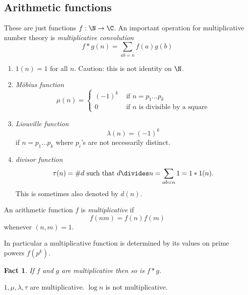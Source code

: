 \documentclass[a4paper]{article}
\newtheorem*{fact}{Fact}
\theoremstyle{definition}
\begin{document}
\subsection{Arithmetic functions}

These are just functions \(f: \N \to \C\). An important operation for multiplicative number theory is \emph{multiplicative convolution}
\[
  f * g(n) = \sum_{ab = n} f(a)g(b)
\]

\begin{eg}\leavevmode
  \begin{enumerate}
  \item \(1(n) = 1\) for all \(n\). Caution: this is not identity on \(\N\).
  \item \emph{Möbius function}
    \[
      \mu(n) =
      \begin{cases}
        (-1)^k & \text{ if } n = p_1 \dots p_k \\
        0 & \text{ if \(n\) is divisible by a square}
      \end{cases}
    \]
  \item \emph{Liouville function}
    \[
      \lambda(n) = (-1)^k
    \]
    if \(n = p_1 \dots p_k\) where \(p_i\)'s are not necessarily distinct.
  \item \emph{divisor function}
    \[
      \tau(n) = \#d \text{ such that } d \divides n = \sum_{ab = n} 1 = 1 * 1(n).
    \]
    This is sometimes also denoted by \(d(n)\).
  \end{enumerate}
\end{eg}

\begin{definition}
  An arithmetic function \(f\) is \emph{multiplicative} if
  \[
    f(nm) = f(n)f(m)
  \]
  whenever \((n, m) = 1\).
\end{definition}

In particular a multiplicative function is determined by its values on prime powers \(f(p^k)\).

\begin{fact}
  If \(f\) and \(g\) are multiplicative then so is \(f * g\).
\end{fact}

\begin{eg}
  \(1, \mu, \lambda, \tau\) are multiplicative. \(\log n\) is not multiplicative.
\end{eg}
\end{document}

